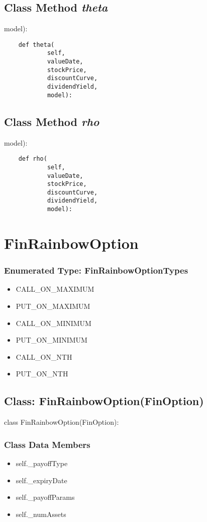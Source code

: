 \documentclass[twoside,11pt]{book}
\begin{document}
\subsection{Class Method {\it theta}}
model):

\begin{lstlisting}
    def theta(
            self,
            valueDate,
            stockPrice,
            discountCurve,
            dividendYield,
            model):
\end{lstlisting}

\subsection{Class Method {\it rho}}
model):

\begin{lstlisting}
    def rho(
            self,
            valueDate,
            stockPrice,
            discountCurve,
            dividendYield,
            model):
\end{lstlisting}

\newpage
\section{FinRainbowOption}

\subsubsection{Enumerated Type: FinRainbowOptionTypes}
\begin{itemize}
\item{CALL\_ON\_MAXIMUM}
\item{PUT\_ON\_MAXIMUM}
\item{CALL\_ON\_MINIMUM}
\item{PUT\_ON\_MINIMUM}
\item{CALL\_ON\_NTH}
\item{PUT\_ON\_NTH}
\end{itemize}

\subsection{Class: FinRainbowOption(FinOption)}
class FinRainbowOption(FinOption):

\subsubsection{Class Data Members}
\begin{itemize}
\item{self.\_payoffType}
\item{self.\_expiryDate}
\item{self.\_payoffParams}
\item{self.\_numAssets}
\end{itemize}
\end{document}
